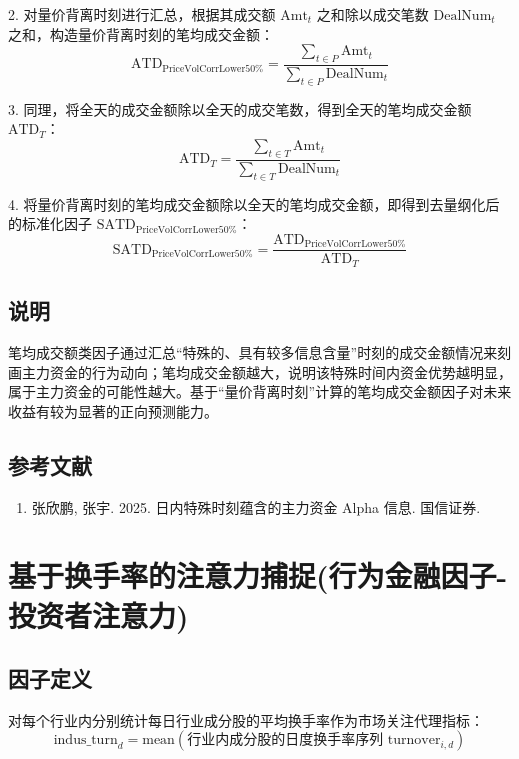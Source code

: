 \documentclass{article}
\begin{document}
2. 对量价背离时刻进行汇总，根据其成交额 \( \mathrm{Amt}_t \) 之和除以成交笔数 \( \mathrm{DealNum}_t \) 之和，构造量价背离时刻的笔均成交金额：
\begin{equation}
    \mathrm{ATD}_{\mathrm{PriceVolCorrLower50\%}} = \frac{\sum_{t \in P} \mathrm{Amt}_t}{\sum_{t \in P} \mathrm{DealNum}_t}
\end{equation}

3. 同理，将全天的成交金额除以全天的成交笔数，得到全天的笔均成交金额 \( \mathrm{ATD}_T \)：
\begin{equation}
    \mathrm{ATD}_T = \frac{\sum_{t \in T} \mathrm{Amt}_t}{\sum_{t \in T} \mathrm{DealNum}_t}
\end{equation}

4. 将量价背离时刻的笔均成交金额除以全天的笔均成交金额，即得到去量纲化后的标准化因子 \( \mathrm{SATD}_{\mathrm{PriceVolCorrLower50\%}} \)：
\begin{equation}
    \mathrm{SATD}_{\mathrm{PriceVolCorrLower50\%}} = \frac{\mathrm{ATD}_{\mathrm{PriceVolCorrLower50\%}}}{\mathrm{ATD}_T}
\end{equation}

\subsection{说明}
笔均成交额类因子通过汇总“特殊的、具有较多信息含量”时刻的成交金额情况来刻画主力资金的行为动向；笔均成交金额越大，说明该特殊时间内资金优势越明显，属于主力资金的可能性越大。基于“量价背离时刻”计算的笔均成交金额因子对未来收益有较为显著的正向预测能力。

\subsection{参考文献}
\begin{enumerate}
    \item 张欣鹏, 张宇. 2025. 日内特殊时刻蕴含的主力资金 Alpha 信息. 国信证券.
\end{enumerate}

\section{基于换手率的注意力捕捉(行为金融因子-投资者注意力)}

\subsection{因子定义}
对每个行业内分别统计每日行业成分股的平均换手率作为市场关注代理指标：
\begin{equation}
    \mathrm{indus\_turn}_d = \mathrm{mean}(\text{行业内成分股的日度换手率序列 } \mathrm{turnover}_{i,d})
\end{equation}
\end{document}
